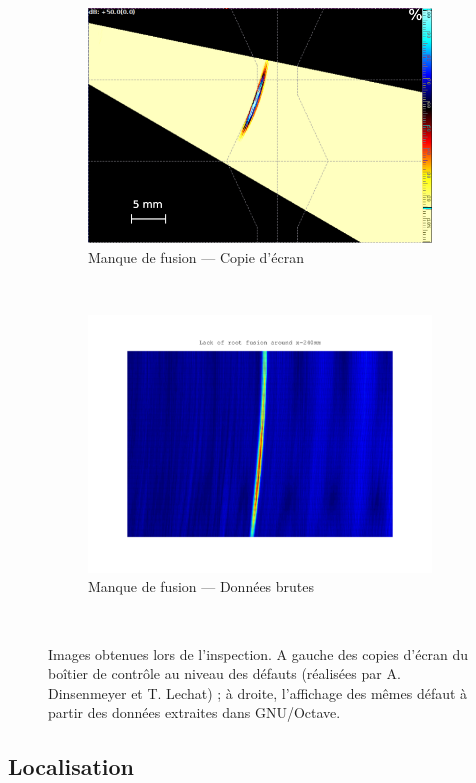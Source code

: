 \begin{figure}[!h]
\begin{subfigure}{0.43\textwidth}
\includegraphics[width=\textwidth]{me_figs/def3.png}
\caption{Manque de fusion --- Copie d'écran}
\end{subfigure}~%
\begin{subfigure}{0.55\textwidth}
\includegraphics[width=\textwidth]{me_figs/fusion_measure.png}
\caption{Manque de fusion --- Données brutes}
\end{subfigure}\\
\caption{Images obtenues lors de l'inspection. A gauche des copies d'écran du boîtier de contrôle au niveau des défauts (réalisées par A. Dinsenmeyer et T. Lechat) ; à droite, l'affichage des mêmes défaut à partir des données extraites dans GNU/Octave.\label{me:measures}}
\end{figure}

\subsection{Localisation}

